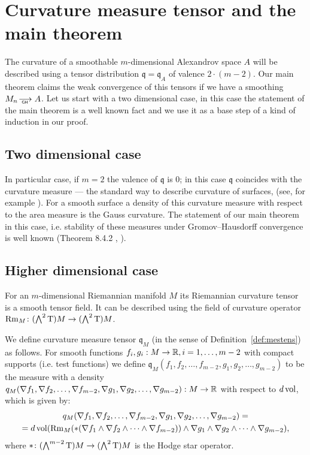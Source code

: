 \documentclass[a4paper,10pt]{article}
\begin{document}

\section {Curvature measure tensor and the main theorem}

The curvature of a smoothable $m$-dimensional Alexandrov space $A$
will be described using a tensor distribution $\mathfrak{q}=\mathfrak{q}_A$ of valence $2\cdot(m-2)$.
Our main theorem claims the weak convergence
of this tensors if we have a smoothing $M_n\GHto A$.
Let us start with a two dimensional case, 
in this case the statement of the main theorem is a well known fact and
we use it as a base step of a kind of induction in our proof. 

 \subsection{Two dimensional case}\label{2dim}

In particular case, if $m=2$ the valence of $\mathfrak{q}$ is $0$;
in this case $\mathfrak{q}$ coincides
 with the curvature measure --- the standard way to describe curvature of surfaces, 
(see, for example \cite{Resh}).
For a smooth surface a density of this curvature measure with respect to the area measure
is   the Gauss  curvature.
The statement of our main theorem in this case, i.e. 
stability of these measures under Gromov--Hausdorff convergence
is well  known (Theorem 8.4.2 \cite{Resh}, \cite{AZ} ).   


\subsection{Higher dimensional case}
For an $m$-dimensional Riemannian manifold $M$
its Riemannian curvature tensor %
 is a smooth tensor field.
It can be described using the field of curvature operator
 $\operatorname{Rm}_M\colon(\bigwedge^2\text{\rm T})M\to (\bigwedge^2\text{\rm T})M$.

We define curvature measure tensor
$\mathfrak{q}_M$ (in the sense of Definition~\ref{def:mestens}) as follows.
 For smooth functions
 $f_i,g_i:M\to\mathbb{R}, i=1,\dots, m-2$
with compact supports (i.e. test functions)
 we define $\mathfrak{q}_M(f_1,f_2,\dots,f_{m-2},g_1,g_2,\dots,g_{m-2})$
to be  the measure with a density
 ${q}_M(\nabla f_1,\nabla f_2,\dots,\nabla f_{m-2},\nabla g_1,\nabla g_2,\dots,\nabla g_{m-2}): M\to\mathbb{R}$
with respect to $d \operatorname{vol}$, which is given by:
\begin{multline*}
{q}_M(\nabla f_1,\nabla f_2,\dots,\nabla f_{m-2},\nabla g_1,\nabla g_2,\dots,\nabla g_{m-2})
=
\\
= d \operatorname{vol} (
\operatorname{Rm}_M(*(\nabla f_1\wedge \nabla f_2\wedge\dots\wedge \nabla f_{m-2}))\wedge\nabla g_1\wedge \nabla g_2\wedge\dots\wedge \nabla g_{m-2}),
\end{multline*}
where ${*}\colon(\bigwedge^{m-2}\text{\rm T})M\to(\bigwedge^2\text{\rm T})M$ is the  Hodge star operator.
\end{document}
